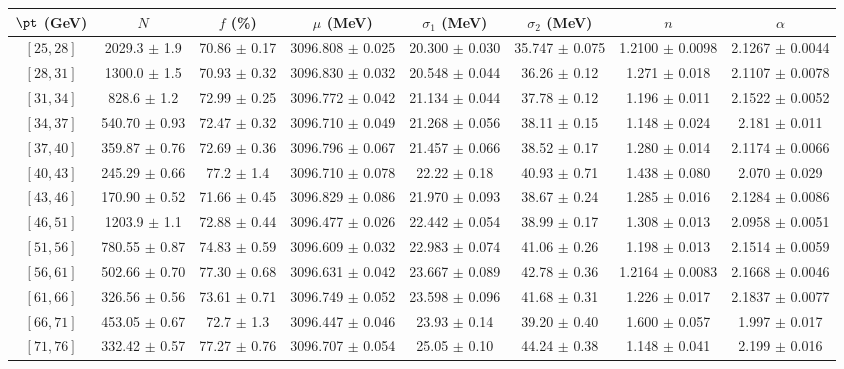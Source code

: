 \begin{tabular}{c||c|c|c|c|c|c|c}
$\pt$ (GeV) & $N$ & $f$ (\%) & $\mu$ (MeV) & $\sigma_1$ (MeV) & $\sigma_2$ (MeV) & $n$ & $\alpha$ \\
\hline
$[25, 28]$ & 2029.3 $\pm$ 1.9 & 70.86 $\pm$ 0.17 & 3096.808 $\pm$ 0.025 & 20.300 $\pm$ 0.030 & 35.747 $\pm$ 0.075 & 1.2100 $\pm$ 0.0098 & 2.1267 $\pm$ 0.0044\\
$[28, 31]$ & 1300.0 $\pm$ 1.5 & 70.93 $\pm$ 0.32 & 3096.830 $\pm$ 0.032 & 20.548 $\pm$ 0.044 & 36.26 $\pm$ 0.12 & 1.271 $\pm$ 0.018 & 2.1107 $\pm$ 0.0078\\
$[31, 34]$ & 828.6 $\pm$ 1.2 & 72.99 $\pm$ 0.25 & 3096.772 $\pm$ 0.042 & 21.134 $\pm$ 0.044 & 37.78 $\pm$ 0.12 & 1.196 $\pm$ 0.011 & 2.1522 $\pm$ 0.0052\\
$[34, 37]$ & 540.70 $\pm$ 0.93 & 72.47 $\pm$ 0.32 & 3096.710 $\pm$ 0.049 & 21.268 $\pm$ 0.056 & 38.11 $\pm$ 0.15 & 1.148 $\pm$ 0.024 & 2.181 $\pm$ 0.011\\
$[37, 40]$ & 359.87 $\pm$ 0.76 & 72.69 $\pm$ 0.36 & 3096.796 $\pm$ 0.067 & 21.457 $\pm$ 0.066 & 38.52 $\pm$ 0.17 & 1.280 $\pm$ 0.014 & 2.1174 $\pm$ 0.0066\\
$[40, 43]$ & 245.29 $\pm$ 0.66 & 77.2 $\pm$ 1.4 & 3096.710 $\pm$ 0.078 & 22.22 $\pm$ 0.18 & 40.93 $\pm$ 0.71 & 1.438 $\pm$ 0.080 & 2.070 $\pm$ 0.029\\
$[43, 46]$ & 170.90 $\pm$ 0.52 & 71.66 $\pm$ 0.45 & 3096.829 $\pm$ 0.086 & 21.970 $\pm$ 0.093 & 38.67 $\pm$ 0.24 & 1.285 $\pm$ 0.016 & 2.1284 $\pm$ 0.0086\\
$[46, 51]$ & 1203.9 $\pm$ 1.1 & 72.88 $\pm$ 0.44 & 3096.477 $\pm$ 0.026 & 22.442 $\pm$ 0.054 & 38.99 $\pm$ 0.17 & 1.308 $\pm$ 0.013 & 2.0958 $\pm$ 0.0051\\
$[51, 56]$ & 780.55 $\pm$ 0.87 & 74.83 $\pm$ 0.59 & 3096.609 $\pm$ 0.032 & 22.983 $\pm$ 0.074 & 41.06 $\pm$ 0.26 & 1.198 $\pm$ 0.013 & 2.1514 $\pm$ 0.0059\\
$[56, 61]$ & 502.66 $\pm$ 0.70 & 77.30 $\pm$ 0.68 & 3096.631 $\pm$ 0.042 & 23.667 $\pm$ 0.089 & 42.78 $\pm$ 0.36 & 1.2164 $\pm$ 0.0083 & 2.1668 $\pm$ 0.0046\\
$[61, 66]$ & 326.56 $\pm$ 0.56 & 73.61 $\pm$ 0.71 & 3096.749 $\pm$ 0.052 & 23.598 $\pm$ 0.096 & 41.68 $\pm$ 0.31 & 1.226 $\pm$ 0.017 & 2.1837 $\pm$ 0.0077\\
$[66, 71]$ & 453.05 $\pm$ 0.67 & 72.7 $\pm$ 1.3 & 3096.447 $\pm$ 0.046 & 23.93 $\pm$ 0.14 & 39.20 $\pm$ 0.40 & 1.600 $\pm$ 0.057 & 1.997 $\pm$ 0.017\\
$[71, 76]$ & 332.42 $\pm$ 0.57 & 77.27 $\pm$ 0.76 & 3096.707 $\pm$ 0.054 & 25.05 $\pm$ 0.10 & 44.24 $\pm$ 0.38 & 1.148 $\pm$ 0.041 & 2.199 $\pm$ 0.016\\

\end{tabular}

